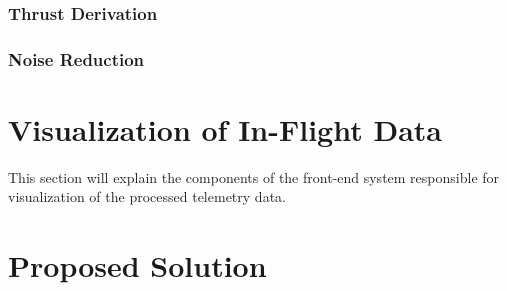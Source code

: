\documentclass[onecolumn, draftclsnofoot,10pt, compsoc]{IEEEtran}
\begin{document}
\subsubsection{Thrust Derivation}




\subsubsection{Noise Reduction}





\section{Visualization of In-Flight Data}
This section will explain the components of the front-end system responsible for visualization of the processed telemetry data.



\section{Proposed Solution}
\end{document}

